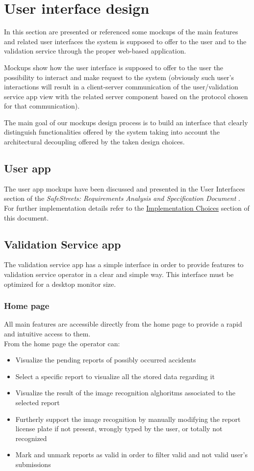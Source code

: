 \setlength{\parindent}{4ex}
\setlength{\parskip}{1ex}

\section{User interface design}
In this section are presented or referenced some mockups of the main features and related user interfaces the system is supposed to offer to the user and to the validation service through the proper web-based application.

Mockups show how the user interface is supposed to offer to the user the possibility to interact and make request to the system (obviously such user's interactions will result in a client-server communication of the user/validation service app view with the related server component based on the protocol chosen for that communication).

The main goal of our mockups design process is to build an interface that clearly distinguish functionalities offered by the system taking into account the architectural decoupling offered by the taken design choices.

\subsection{User app}
The user app mockups have been discussed and presented in the User Interfaces section of the \emph{SafeStreets: Requirements Analysis and Specification Document} \cite{RASD}. For further implementation details refer to the \hyperref[sec:implementationChoices]{Implementation Choices} section of this document.

\subsection{Validation Service app}
The validation service app has a simple interface in order to provide features to validation service operator in a clear and simple way. This interface must be optimized for a desktop monitor size.

\subsubsection{Home page}
All main features are accessible directly from the home page to provide a rapid and intuitive access to them. \\
From the home page the operator can:
\begin{itemize}
	\item Visualize the pending reports of possibly occurred accidents
	\item Select a specific report to visualize all the stored data regarding it
	\item Visualize the result of the image recognition alghoritms associated to the selected report
	\item Furtherly support the image recognition by manually modifying the report license plate if not present, wrongly typed by the user, or totally not recognized
	\item Mark and unmark reports as valid in order to ﬁlter valid and not valid user’s submissions
\end{itemize}

